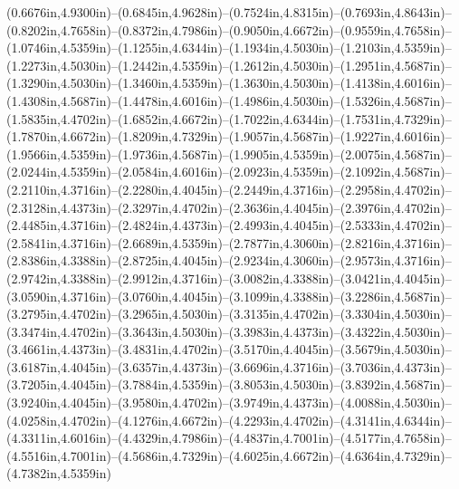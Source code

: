 (0.6676in,4.9300in)--(0.6845in,4.9628in)--(0.7524in,4.8315in)--(0.7693in,4.8643in)--(0.8202in,4.7658in)--(0.8372in,4.7986in)--(0.9050in,4.6672in)--(0.9559in,4.7658in)--(1.0746in,4.5359in)--(1.1255in,4.6344in)--(1.1934in,4.5030in)--(1.2103in,4.5359in)--(1.2273in,4.5030in)--(1.2442in,4.5359in)--(1.2612in,4.5030in)--(1.2951in,4.5687in)--(1.3290in,4.5030in)--(1.3460in,4.5359in)--(1.3630in,4.5030in)--(1.4138in,4.6016in)--(1.4308in,4.5687in)--(1.4478in,4.6016in)--(1.4986in,4.5030in)--(1.5326in,4.5687in)--(1.5835in,4.4702in)--(1.6852in,4.6672in)--(1.7022in,4.6344in)--(1.7531in,4.7329in)--(1.7870in,4.6672in)--(1.8209in,4.7329in)--(1.9057in,4.5687in)--(1.9227in,4.6016in)--(1.9566in,4.5359in)--(1.9736in,4.5687in)--(1.9905in,4.5359in)--(2.0075in,4.5687in)--(2.0244in,4.5359in)--(2.0584in,4.6016in)--(2.0923in,4.5359in)--(2.1092in,4.5687in)--(2.2110in,4.3716in)--(2.2280in,4.4045in)--(2.2449in,4.3716in)--(2.2958in,4.4702in)--(2.3128in,4.4373in)--(2.3297in,4.4702in)--(2.3636in,4.4045in)--(2.3976in,4.4702in)--(2.4485in,4.3716in)--(2.4824in,4.4373in)--(2.4993in,4.4045in)--(2.5333in,4.4702in)--(2.5841in,4.3716in)--(2.6689in,4.5359in)--(2.7877in,4.3060in)--(2.8216in,4.3716in)--(2.8386in,4.3388in)--(2.8725in,4.4045in)--(2.9234in,4.3060in)--(2.9573in,4.3716in)--(2.9742in,4.3388in)--(2.9912in,4.3716in)--(3.0082in,4.3388in)--(3.0421in,4.4045in)--(3.0590in,4.3716in)--(3.0760in,4.4045in)--(3.1099in,4.3388in)--(3.2286in,4.5687in)--(3.2795in,4.4702in)--(3.2965in,4.5030in)--(3.3135in,4.4702in)--(3.3304in,4.5030in)--(3.3474in,4.4702in)--(3.3643in,4.5030in)--(3.3983in,4.4373in)--(3.4322in,4.5030in)--(3.4661in,4.4373in)--(3.4831in,4.4702in)--(3.5170in,4.4045in)--(3.5679in,4.5030in)--(3.6187in,4.4045in)--(3.6357in,4.4373in)--(3.6696in,4.3716in)--(3.7036in,4.4373in)--(3.7205in,4.4045in)--(3.7884in,4.5359in)--(3.8053in,4.5030in)--(3.8392in,4.5687in)--(3.9240in,4.4045in)--(3.9580in,4.4702in)--(3.9749in,4.4373in)--(4.0088in,4.5030in)--(4.0258in,4.4702in)--(4.1276in,4.6672in)--(4.2293in,4.4702in)--(4.3141in,4.6344in)--(4.3311in,4.6016in)--(4.4329in,4.7986in)--(4.4837in,4.7001in)--(4.5177in,4.7658in)--(4.5516in,4.7001in)--(4.5686in,4.7329in)--(4.6025in,4.6672in)--(4.6364in,4.7329in)--(4.7382in,4.5359in)
